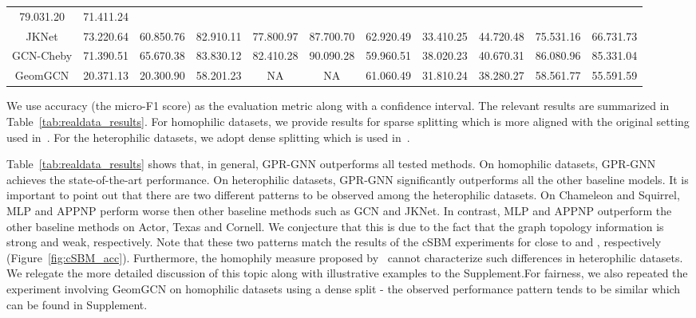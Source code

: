 \documentclass{article} \usepackage{iclr2021_conference,times}
\begin{document}
\begin{table}[t]
\begin{tabular}{@{}ccccccccccc@{}}
  79.03\tiny{1.20} &
  71.41\tiny{1.24} \\
JKNet &
  73.22\tiny{0.64} &
  60.85\tiny{0.76} &
  82.91\tiny{0.11} &
  77.80\tiny{0.97} &
  87.70\tiny{0.70} &
  62.92\tiny{0.49} &
  33.41\tiny{0.25} &
  44.72\tiny{0.48} &
  75.53\tiny{1.16} &
  66.73\tiny{1.73} \\
GCN-Cheby &
  71.39\tiny{0.51} &
  65.67\tiny{0.38} &
  83.83\tiny{0.12} &
  82.41\tiny{0.28} &
  90.09\tiny{0.28} &
  59.96\tiny{0.51} &
  38.02\tiny{0.23} &
  40.67\tiny{0.31} &
  86.08\tiny{0.96} &
  85.33\tiny{1.04} \\
GeomGCN &
  20.37\tiny{1.13} &
  20.30\tiny{0.90} &
  58.20\tiny{1.23} &
  NA &
  NA &
  61.06\tiny{0.49} &
  31.81\tiny{0.24} &
  38.28\tiny{0.27} &
  58.56\tiny{1.77} &
  55.59\tiny{1.59} \\ \bottomrule
\end{tabular}
\normalsize
\vspace{-0.3cm}
\end{table}
We use accuracy (the micro-F1 score) as the evaluation metric along with a  confidence interval. The relevant results are summarized in Table~\ref{tab:realdata_results}. For homophilic datasets, we provide results for sparse splitting which is more aligned with the original setting used in~\citet{kipf2017semi,shchur2018pitfalls}. For the heterophilic datasets, we adopt dense splitting which is used in~\cite{pei2019geom}. 

Table~\ref{tab:realdata_results} shows that, in general, GPR-GNN outperforms all tested methods. On homophilic datasets, GPR-GNN achieves the state-of-the-art performance. On heterophilic datasets, GPR-GNN significantly outperforms all the other baseline models. It is important to point out that there are two different patterns to be observed among the heterophilic datasets. On Chameleon and Squirrel, MLP and APPNP perform worse then other baseline methods such as GCN and JKNet. In contrast, MLP and APPNP outperform the other baseline methods on Actor, Texas and Cornell. We conjecture that this is due to the fact that the graph topology information is strong and weak, respectively. Note that these two patterns match the results of the cSBM experiments for  close to  and , respectively (Figure~\ref{fig:cSBM_acc}). Furthermore, the homophily measure  proposed by~\cite{pei2019geom} cannot characterize such differences in heterophilic datasets. We relegate the more detailed discussion of this topic along with illustrative examples to the Supplement.For fairness, we also repeated the experiment involving GeomGCN on homophilic datasets using a dense split - the observed performance pattern tends to be similar which can be found in Supplement.
\end{document}
